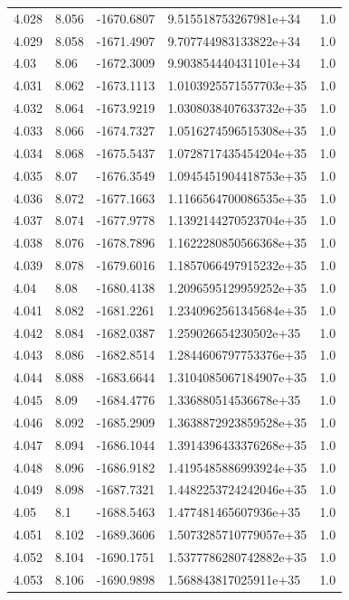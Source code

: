 \begin{tabular}{lllll}
4.028 & 8.056 & -1670.6807 & 9.515518753267981e+34 & 1.0 \\
4.029 & 8.058 & -1671.4907 & 9.707744983133822e+34 & 1.0 \\
4.03 & 8.06 & -1672.3009 & 9.903854440431101e+34 & 1.0 \\
4.031 & 8.062 & -1673.1113 & 1.0103925571557703e+35 & 1.0 \\
4.032 & 8.064 & -1673.9219 & 1.0308038407633732e+35 & 1.0 \\
4.033 & 8.066 & -1674.7327 & 1.0516274596515308e+35 & 1.0 \\
4.034 & 8.068 & -1675.5437 & 1.0728717435454204e+35 & 1.0 \\
4.035 & 8.07 & -1676.3549 & 1.0945451904418753e+35 & 1.0 \\
4.036 & 8.072 & -1677.1663 & 1.1166564700086535e+35 & 1.0 \\
4.037 & 8.074 & -1677.9778 & 1.1392144270523704e+35 & 1.0 \\
4.038 & 8.076 & -1678.7896 & 1.1622280850566368e+35 & 1.0 \\
4.039 & 8.078 & -1679.6016 & 1.1857066497915232e+35 & 1.0 \\
4.04 & 8.08 & -1680.4138 & 1.2096595129959252e+35 & 1.0 \\
4.041 & 8.082 & -1681.2261 & 1.2340962561345684e+35 & 1.0 \\
4.042 & 8.084 & -1682.0387 & 1.259026654230502e+35 & 1.0 \\
4.043 & 8.086 & -1682.8514 & 1.2844606797753376e+35 & 1.0 \\
4.044 & 8.088 & -1683.6644 & 1.3104085067184907e+35 & 1.0 \\
4.045 & 8.09 & -1684.4776 & 1.336880514536678e+35 & 1.0 \\
4.046 & 8.092 & -1685.2909 & 1.3638872923859528e+35 & 1.0 \\
4.047 & 8.094 & -1686.1044 & 1.3914396433376268e+35 & 1.0 \\
4.048 & 8.096 & -1686.9182 & 1.4195485886993924e+35 & 1.0 \\
4.049 & 8.098 & -1687.7321 & 1.4482253724242046e+35 & 1.0 \\
4.05 & 8.1 & -1688.5463 & 1.477481465607936e+35 & 1.0 \\
4.051 & 8.102 & -1689.3606 & 1.5073285710779057e+35 & 1.0 \\
4.052 & 8.104 & -1690.1751 & 1.5377786280742882e+35 & 1.0 \\
4.053 & 8.106 & -1690.9898 & 1.568843817025911e+35 & 1.0 \\

\end{tabular}
